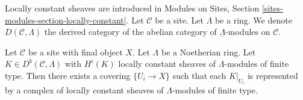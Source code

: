 \noindent
Locally constant sheaves are introduced in
Modules on Sites, Section \ref{sites-modules-section-locally-constant}.
Let $\mathcal{C}$ be a site.
Let $\Lambda$ be a ring.
We denote $D(\mathcal{C}, \Lambda)$ the derived category of the
abelian category of $\underline{\Lambda}$-modules on $\mathcal{C}$.

\begin{lemma}
\label{lemma-locally-constant}
Let $\mathcal{C}$ be a site with final object $X$.
Let $\Lambda$ be a Noetherian ring.
Let $K \in D^b(\mathcal{C}, \Lambda)$
with $H^i(K)$ locally constant sheaves of $\Lambda$-modules
of finite type. Then there exists a covering $\{U_i \to X\}$
such that each $K|_{U_i}$ is represented by
a complex of locally constant sheaves of $\Lambda$-modules
of finite type.
\end{lemma}

